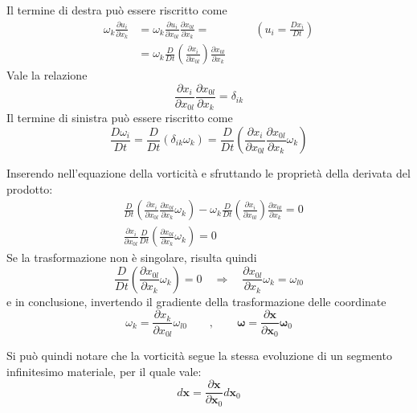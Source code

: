 \noindent
Il termine di destra può essere riscritto come
\begin{equation}
\begin{aligned}
 \omega_k \frac{\partial u_i}{\partial x_k} & = 
 \omega_k \frac{\partial u_i}{\partial x_{0 l}}
      \frac{\partial x_{0 l}}{\partial x_k} = \qquad \qquad
      \left(u_i = \frac{D x_i}{D t}\right)  \\
 & = \omega_k \frac{D}{Dt} \left( \frac{\partial x_i}{\partial x_{0 l}}
    \right)\frac{\partial x_{0 l}}{\partial x_k} 
\end{aligned}
\end{equation}
Vale la relazione
\begin{equation}
 \frac{\partial x_i}{\partial x_{0 l}}
   \frac{\partial x_{0 l}}{\partial x_k} = \delta_{ik}
\end{equation}
Il termine di sinistra può essere riscritto come
\begin{equation}
 \frac{D \omega_i}{Dt} = \frac{D}{Dt} \left(\delta_{ik} \omega_k \right) =
 \frac{D}{Dt} \left( \frac{\partial x_i}{\partial x_{0 l}}
   \frac{\partial x_{0 l}}{\partial x_k} \omega_k \right)
\end{equation}

Inserendo nell'equazione della vorticità e sfruttando le proprietà
 della derivata del prodotto:
\begin{equation}
\begin{aligned}
 &  \frac{D}{Dt} \left(  \frac{\partial x_i}{\partial x_{0 l}}
   \frac{\partial x_{0 l}}{\partial x_k} \omega_k  \right)  - 
  \omega_k \frac{D}{Dt} \left( \frac{\partial x_i}{\partial x_{0 l}}
    \right)\frac{\partial x_{0 l}}{\partial x_k} = 0 \\
 &  \frac{\partial x_i}{\partial x_{0 l}} 
  \frac{D}{Dt} \left( \frac{\partial x_{0 l}}{\partial x_k} \omega_k
    \right) = 0
\end{aligned}
\end{equation}
Se la trasformazione non è singolare, risulta quindi
\begin{equation}
  \frac{D}{Dt} \left( \frac{\partial x_{0 l}}{\partial x_k} \omega_k
    \right) = 0  \quad \Rightarrow \quad
  \frac{\partial x_{0 l}}{\partial x_k} \omega_k = \omega_{l 0}
\end{equation}
e in conclusione, invertendo il gradiente della trasformazione delle
 coordinate
\begin{equation}\label{eqn:bilanci:vorticitàLagrange}
   \omega_k = \frac{\partial x_k}{\partial x_{0 l}}\omega_{l 0}
   \qquad , \qquad \bm{\omega} = \frac{\partial \bm{x}}{\partial \bm{x}_0}
      \bm{\omega}_0
\end{equation}

Si può quindi notare che la vorticità segue la stessa evoluzione
 di un segmento infinitesimo materiale, per il quale vale:
\begin{equation}
  d\bm{x} = \frac{\partial \bm{x}}{\partial \bm{x}_0}
      d\bm{x}_0
\end{equation}









